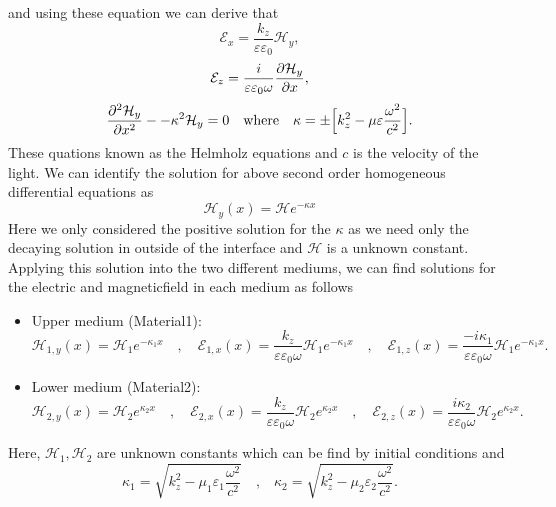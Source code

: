 \documentclass[a4paper]{article}
\numberwithin{equation}{subsection}
\numberwithin{equation}{section}
\begin{document}
and using these equation we can derive that
\begin{equation}
  \mathcal{E}_x = \frac{k_z }{\varepsilon \varepsilon_0} \mathcal{H}_y,
\end{equation}
\begin{equation}
  \mathcal{E}_z = \frac{i}{\varepsilon \varepsilon_0 \omega}
  \pdv{\mathcal{H}_y}{x},
\end{equation}
\begin{equation}
  \pdv[2]{\mathcal{H}_y}{x} -
  - \kappa^2 \mathcal{H}_y = 0 \quad
  \text{where} \quad
  \kappa = \pm\Big[k_z^2 - \mu\varepsilon \frac{\omega^2}{c^2}\Big].
\end{equation}
These quations known as the Helmholz equations and $c$ is the velocity of the light. We can identify the solution for above second order homogeneous differential equations as
\begin{equation}
  {\mathcal{H}_{y}}(x) = \mathcal{H} e^{-\kappa x}
\end{equation}
Here we only considered the positive solution for the $\kappa$ as we need only the decaying solution in outside of the interface and $\mathcal{H}$ is a unknown constant. Applying this solution into the two different mediums, we can find solutions for the electric and magneticfield in each medium as follows
\begin{itemize}
  \item Upper medium (Material1):\\
  \begin{equation}
    {\mathcal{H}_{1,y}}(x) = \mathcal{H}_1 e^{-\kappa_1 x} \quad,\quad
    {\mathcal{E}_{1,x}}(x) = \frac{k_z}{\varepsilon \varepsilon_0 \omega}\mathcal{H}_1 e^{-\kappa_1 x} \quad,\quad
    {\mathcal{E}_{1,z}}(x) = \frac{-i\kappa_1}{\varepsilon \varepsilon_0 \omega}\mathcal{H}_1 e^{-\kappa_1 x}.
    \end{equation}
    \item Lower medium (Material2):\\
    \begin{equation}
      {\mathcal{H}_{2,y}}(x) = \mathcal{H}_2 e^{\kappa_2 x} \quad,\quad
      {\mathcal{E}_{2,x}}(x) = \frac{k_z}{\varepsilon \varepsilon_0 \omega}\mathcal{H}_2 e^{\kappa_2 x} \quad,\quad
      {\mathcal{E}_{2,z}}(x) = \frac{i \kappa_2}{\varepsilon \varepsilon_0 \omega}\mathcal{H}_2 e^{\kappa_2 x}.
  \end{equation}
\end{itemize}
Here, $\mathcal{H}_1, \mathcal{H}_2$ are unknown constants which can be find by initial conditions and
\begin{equation}
  \kappa_1 = \sqrt{k_z^2 - \mu_1\varepsilon_1 \frac{\omega^2}{c^2}} \quad
  \text{,} \quad
  \kappa_2 = \sqrt{k_z^2 - \mu_2\varepsilon_2 \frac{\omega^2}{c^2}}.
\end{equation}
\end{document}
